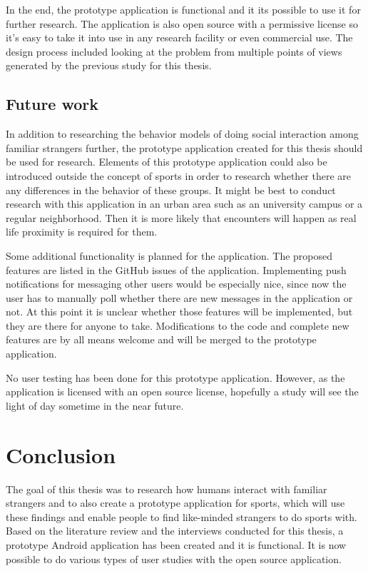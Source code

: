 In the end, the prototype application is functional and it its possible to use it for further research. The application is also open source with a permissive license so it's easy to take it into use in any research facility or even commercial use. The design process included looking at the problem from multiple points of views generated by the previous study for this thesis.

\subsection{Future work}

In addition to researching the behavior models of doing social interaction among familiar strangers further, the prototype application created for this thesis should be used for research. Elements of this prototype application could also be introduced outside the concept of sports in order to research whether there are any differences in the behavior of these groups. It might be best to conduct research with this application in an urban area such as an university campus or a regular neighborhood. Then it is more likely that encounters will happen as real life proximity is required for them.

Some additional functionality is planned for the application. The proposed features are listed in the GitHub issues of the application. Implementing push notifications for messaging other users would be especially nice, since now the user has to manually poll whether there are new messages in the application or not. At this point it is unclear whether those features will be implemented, but they are there for anyone to take. Modifications to the code and complete new features are by all means welcome and will be merged to the prototype application.

No user testing has been done for this prototype application. However, as the application is licensed with an open source license, hopefully a study will see the light of day sometime in the near future.
\clearpage

\section{Conclusion}

The goal of this thesis was to research how humans interact with familiar strangers and to also create a prototype application for sports, which will use these findings and enable people to find like-minded strangers to do sports with. Based on the literature review and the interviews conducted for this thesis, a prototype Android application has been created and it is functional. It is now possible to do various types of user studies with the open source application.


